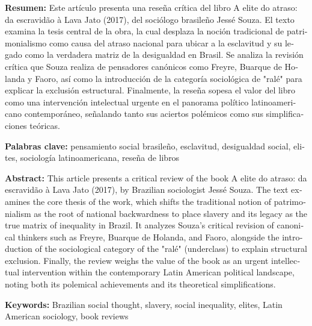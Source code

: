 \documentclass{article}
\begin{document}
\begin{tcolorbox}[colback=brown!8!white,colframe=brown!8!white,boxrule=0pt,arc=2pt,left=4pt,right=4pt,top=3pt,bottom=3pt,before skip=4pt,after skip=4pt]
\begin{otherlanguage}{spanish}
\sffamily\small \textbf{Resumen:} Este artículo presenta una reseña crítica del libro A elite do atraso: da escravidão à Lava Jato (2017), del sociólogo brasileño Jessé Souza. El texto examina la tesis central de la obra, la cual desplaza la noción tradicional de patrimonialismo como causa del atraso nacional para ubicar a la esclavitud y su legado como la verdadera matriz de la desigualdad en Brasil. Se analiza la revisión crítica que Souza realiza de pensadores canónicos como Freyre, Buarque de Holanda y Faoro, así como la introducción de la categoría sociológica de "ralé" para explicar la exclusión estructural. Finalmente, la reseña sopesa el valor del libro como una intervención intelectual urgente en el panorama político latinoamericano contemporáneo, señalando tanto sus aciertos polémicos como sus simplificaciones teóricas.
\par\smallskip\noindent\textbf{Palabras clave:} pensamiento social brasileño, esclavitud, desigualdad social, elites, sociología latinoamericana, reseña de libros
\end{otherlanguage}
\end{tcolorbox}

\begin{tcolorbox}[colback=brown!8!white,colframe=brown!8!white,boxrule=0pt,arc=2pt,left=4pt,right=4pt,top=3pt,bottom=3pt,before skip=4pt,after skip=4pt]
\begin{otherlanguage}{english}
\sffamily\small \textbf{Abstract:} This article presents a critical review of the book A elite do atraso: da escravidão à Lava Jato (2017), by Brazilian sociologist Jessé Souza. The text examines the core thesis of the work, which shifts the traditional notion of patrimonialism as the root of national backwardness to place slavery and its legacy as the true matrix of inequality in Brazil. It analyzes Souza's critical revision of canonical thinkers such as Freyre, Buarque de Holanda, and Faoro, alongside the introduction of the sociological category of the "ralé" (underclass) to explain structural exclusion. Finally, the review weighs the value of the book as an urgent intellectual intervention within the contemporary Latin American political landscape, noting both its polemical achievements and its theoretical simplifications.
\par\smallskip\noindent\textbf{Keywords:} Brazilian social thought, slavery, social inequality, elites, Latin American sociology, book reviews
\end{otherlanguage}
\end{tcolorbox}
\end{document}
